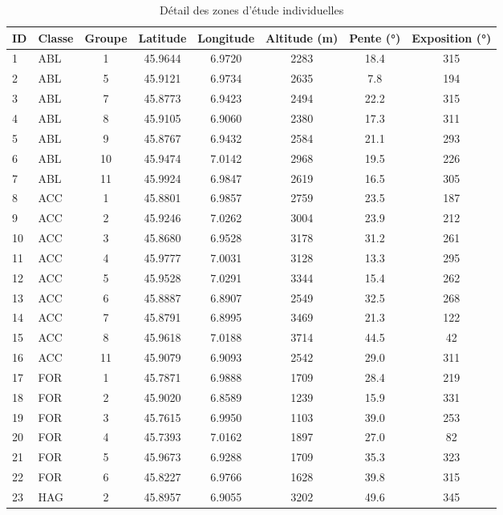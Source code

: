 
\begin{table}[htbp]
\centering
\caption{Détail des zones d'étude individuelles}
\label{tab:detailed_study_areas}
\begin{tabular}{|l|l|c|c|c|c|c|c|}
\hline
\textbf{ID} & \textbf{Classe} & \textbf{Groupe} & \textbf{Latitude} & \textbf{Longitude} & \textbf{Altitude (m)} & \textbf{Pente (°)} & \textbf{Exposition (°)} \\
\hline
1 & ABL & 1 & 45.9644 & 6.9720 & 2283 & 18.4 & 315 \\
2 & ABL & 5 & 45.9121 & 6.9734 & 2635 & 7.8 & 194 \\
3 & ABL & 7 & 45.8773 & 6.9423 & 2494 & 22.2 & 315 \\
4 & ABL & 8 & 45.9105 & 6.9060 & 2380 & 17.3 & 311 \\
5 & ABL & 9 & 45.8767 & 6.9432 & 2584 & 21.1 & 293 \\
6 & ABL & 10 & 45.9474 & 7.0142 & 2968 & 19.5 & 226 \\
7 & ABL & 11 & 45.9924 & 6.9847 & 2619 & 16.5 & 305 \\
8 & ACC & 1 & 45.8801 & 6.9857 & 2759 & 23.5 & 187 \\
9 & ACC & 2 & 45.9246 & 7.0262 & 3004 & 23.9 & 212 \\
10 & ACC & 3 & 45.8680 & 6.9528 & 3178 & 31.2 & 261 \\
11 & ACC & 4 & 45.9777 & 7.0031 & 3128 & 13.3 & 295 \\
12 & ACC & 5 & 45.9528 & 7.0291 & 3344 & 15.4 & 262 \\
13 & ACC & 6 & 45.8887 & 6.8907 & 2549 & 32.5 & 268 \\
14 & ACC & 7 & 45.8791 & 6.8995 & 3469 & 21.3 & 122 \\
15 & ACC & 8 & 45.9618 & 7.0188 & 3714 & 44.5 & 42 \\
16 & ACC & 11 & 45.9079 & 6.9093 & 2542 & 29.0 & 311 \\
17 & FOR & 1 & 45.7871 & 6.9888 & 1709 & 28.4 & 219 \\
18 & FOR & 2 & 45.9020 & 6.8589 & 1239 & 15.9 & 331 \\
19 & FOR & 3 & 45.7615 & 6.9950 & 1103 & 39.0 & 253 \\
20 & FOR & 4 & 45.7393 & 7.0162 & 1897 & 27.0 & 82 \\
21 & FOR & 5 & 45.9673 & 6.9288 & 1709 & 35.3 & 323 \\
22 & FOR & 6 & 45.8227 & 6.9766 & 1628 & 39.8 & 315 \\
23 & HAG & 2 & 45.8957 & 6.9055 & 3202 & 49.6 & 345 \\

\end{tabular}
\end{table}
